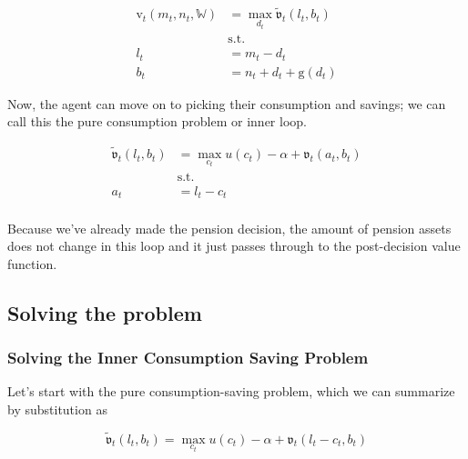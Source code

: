 \documentclass{article}
\newcommand{\util}{u}
\newcommand{\bRat}{b}
\newcommand{\cRat}{c}
\newcommand{\vFunc}{\mathrm{v}}
\newcommand{\aRat}{a}
\newcommand{\mRat}{m}
\newcommand{\vOpt}{\tilde{\mathfrak{v}}}
\newcommand{\vEnd}{\mathfrak{v}}
\newcommand{\nRat}{n}
\newcommand{\dRat}{d}
\newcommand{\gFunc}{\mathrm{g}}
\newcommand{\lRat}{l}
\newcommand{\Work}{\mathbb{W}}
\newcommand{\kapShare}{\alpha}
\begin{document}
\begin{equation}
\begin{split}
        \vFunc_{t}(\mRat_{t}, \nRat_{t}, \Work) & = \max_{\dRat_{t}}
        \vOpt_{t}(\lRat_{t}, \bRat_{t}) \\
        & \text{s.t.} \\
        \lRat_{t} & = \mRat_{t} - \dRat_{t} \\
        \bRat_{t} & = \nRat_{t} + \dRat_{t} + \gFunc(\dRat_{t})
    \end{split}
\end{equation}

Now, the agent can move on to picking their consumption and savings; we can call this
the pure consumption problem or inner loop.

\begin{equation}
\begin{split}
        \vOpt_{t}(\lRat_{t}, \bRat_{t}) & = \max_{\cRat_{t}}
        \util(\cRat_{t}) - \kapShare  + \vEnd_{t}(\aRat_{t}, \bRat_{t}) \\
        & \text{s.t.} \\
        \aRat_{t} & = \lRat_{t} - \cRat_{t} \\
    \end{split}
\end{equation}

Because we've already made the pension decision, the amount of pension assets
does not change in this loop and it just passes through to the post-decision
value function.

\subsection{Solving the problem}\label{Solving the problem}

\subsubsection{Solving the Inner Consumption Saving Problem}\label{Solving the Inner Consumption Saving Problem}

Let's start with the pure consumption-saving problem, which we can summarize by
substitution as

\begin{equation}
\vOpt_{t}(\lRat_{t}, \bRat_{t}) = \max_{\cRat_{t}} \util(\cRat_{t}) - \kapShare +
    \vEnd_{t}(\lRat_{t} - \cRat_{t}, \bRat_{t})
\end{equation}
\end{document}
